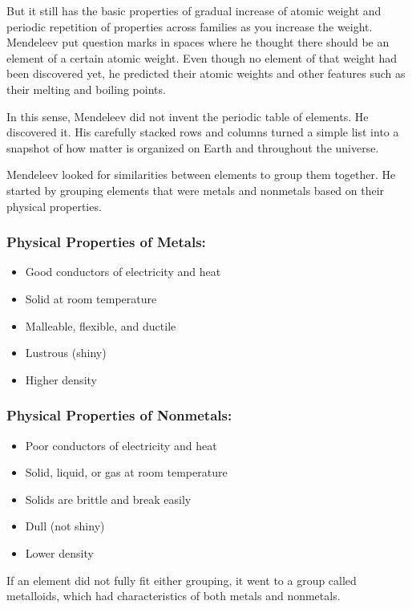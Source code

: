 But it still has the basic properties of gradual increase of atomic weight and
periodic repetition of properties across families as you increase the weight.
Mendeleev put question marks in spaces where he thought there should be an
element of a certain atomic weight. Even though no element of that weight had
been discovered yet, he predicted their atomic weights and other features such
as their melting and boiling points.

In this sense, Mendeleev did not invent the periodic table of elements. He
discovered it. His carefully stacked rows and columns turned a simple list into
a snapshot of how matter is organized on Earth and throughout the universe.

Mendeleev looked for similarities between elements to group them together. He
started by grouping elements that were metals and nonmetals based on their
physical properties.

\subsubsection*{Physical Properties of Metals:}

\begin{itemize}
    \item Good conductors of electricity and heat
    \item Solid at room temperature
    \item Malleable, flexible, and ductile
    \item Lustrous (shiny)
    \item Higher density
\end{itemize}

\subsubsection*{Physical Properties of Nonmetals:}

\begin{itemize}
    \item Poor conductors of electricity and heat
    \item Solid, liquid, or gas at room temperature
    \item Solids are brittle and break easily
    \item Dull (not shiny)
    \item Lower density
\end{itemize}

If an element did not fully fit either grouping, it went to a group called
metalloids, which had characteristics of both metals and nonmetals.

